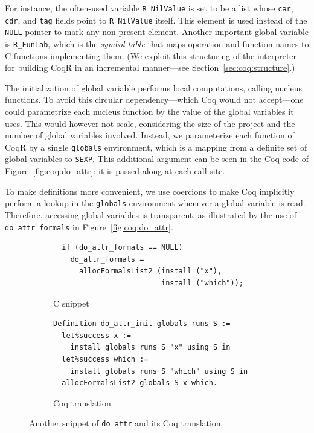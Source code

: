 \documentclass[
    sigplan,
    10pt,
    review, %
    natbib=false %
 ]{acmart}
\newcommand\CoqR{CoqR}
\newcommand\changed[1]{{\color{orange} #1}}
\begin{document}
For instance, the often-used variable \texttt{R_NilValue}
is set to be a list whose \texttt{car}, \texttt{cdr},
and \texttt{tag} fields point to \texttt{R_NilValue} itself.
This element is used instead of the \texttt{NULL} pointer
to mark any non-present element. Another important global variable is
\texttt{R_FunTab}, which is the {\em symbol table} that maps operation and function names to C functions implementing them. (We exploit this structuring of the interpreter for building \CoqR{} in an incremental manner---see Section~\ref{sec:coq:structure}.)

%
\changed{The initialization of global variable performs local computations, calling nucleus functions.}
To avoid this circular dependency---which Coq would not accept---one could parametrize each nucleus function by the value of the global variables it uses.
This would however not scale, considering the size of the project and the number of global variables involved.
%
Instead, we parameterize each function of \CoqR{} by a single \texttt{globals} environment, which is a mapping from a definite set of global variables to \texttt{SEXP}. This additional argument can be seen in the Coq code of Figure~\ref{fig:coq:do_attr}: it is passed along at each call site.

To make definitions more convenient, we use coercions to make Coq implicitly perform a lookup in the \texttt{globals} environment whenever a global variable is read. Therefore, accessing global variables is transparent, as illustrated by the use of \texttt{do_attr_formals} in Figure~\ref{fig:coq:do_attr}.


\begin{figure}
    \centering{}
\begin{subfigure}{.5\textwidth}
\begin{verbatim}
  if (do_attr_formals == NULL)
    do_attr_formals =
      allocFormalsList2 (install ("x"),
                         install ("which"));
\end{verbatim}
    \caption{C snippet}
    \label{fig:c:do_attr:formals}
\end{subfigure}
\begin{subfigure}{.49\textwidth}
\begin{verbatim}
Definition do_attr_init globals runs S :=
  let%success x :=
    install globals runs S "x" using S in
  let%success which :=
    install globals runs S "which" using S in
  allocFormalsList2 globals S x which.
\end{verbatim}
    \caption{Coq translation}
    \label{fig:coq:do_attr:formals}
\end{subfigure}
\vspace{-1em}
    \caption{Another snippet of \texttt{do_attr} and its Coq translation}
    \label{fig:do_attr:formals}
\end{figure}
\end{document}

